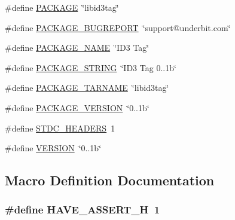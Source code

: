 \begin{DoxyCompactItemize}
\item 
\#define \hyperlink{lib-src_2libid3tag_2msvc_09_09_2config_8h_aca8570fb706c81df371b7f9bc454ae03}{P\+A\+C\+K\+A\+GE}~\char`\"{}libid3tag\char`\"{}
\item 
\#define \hyperlink{lib-src_2libid3tag_2msvc_09_09_2config_8h_a1d1d2d7f8d2f95b376954d649ab03233}{P\+A\+C\+K\+A\+G\+E\+\_\+\+B\+U\+G\+R\+E\+P\+O\+RT}~\char`\"{}support@underbit.\+com\char`\"{}
\item 
\#define \hyperlink{lib-src_2libid3tag_2msvc_09_09_2config_8h_a1c0439e4355794c09b64274849eb0279}{P\+A\+C\+K\+A\+G\+E\+\_\+\+N\+A\+ME}~\char`\"{}I\+D3 Tag\char`\"{}
\item 
\#define \hyperlink{lib-src_2libid3tag_2msvc_09_09_2config_8h_ac73e6f903c16eca7710f92e36e1c6fbf}{P\+A\+C\+K\+A\+G\+E\+\_\+\+S\+T\+R\+I\+NG}~\char`\"{}I\+D3 Tag 0..\+1b\char`\"{}
\item 
\#define \hyperlink{lib-src_2libid3tag_2msvc_09_09_2config_8h_af415af6bfede0e8d5453708afe68651c}{P\+A\+C\+K\+A\+G\+E\+\_\+\+T\+A\+R\+N\+A\+ME}~\char`\"{}libid3tag\char`\"{}
\item 
\#define \hyperlink{lib-src_2libid3tag_2msvc_09_09_2config_8h_aa326a05d5e30f9e9a4bb0b4469d5d0c0}{P\+A\+C\+K\+A\+G\+E\+\_\+\+V\+E\+R\+S\+I\+ON}~\char`\"{}0..\+1b\char`\"{}
\item 
\#define \hyperlink{lib-src_2libid3tag_2msvc_09_09_2config_8h_a550e5c272cc3cf3814651721167dcd23}{S\+T\+D\+C\+\_\+\+H\+E\+A\+D\+E\+RS}~1
\item 
\#define \hyperlink{lib-src_2libid3tag_2msvc_09_09_2config_8h_a1c6d5de492ac61ad29aec7aa9a436bbf}{V\+E\+R\+S\+I\+ON}~\char`\"{}0..\+1b\char`\"{}
\end{DoxyCompactItemize}


\subsection{Macro Definition Documentation}
\subsubsection[{\texorpdfstring{H\+A\+V\+E\+\_\+\+A\+S\+S\+E\+R\+T\+\_\+H}{HAVE_ASSERT_H}}]{\setlength{\rightskip}{0pt plus 5cm}\#define H\+A\+V\+E\+\_\+\+A\+S\+S\+E\+R\+T\+\_\+H~1}\hypertarget{lib-src_2libid3tag_2msvc_09_09_2config_8h_ad0eabe2e5407bc73450eb15b657983cd}{}\label{lib-src_2libid3tag_2msvc_09_09_2config_8h_ad0eabe2e5407bc73450eb15b657983cd}


